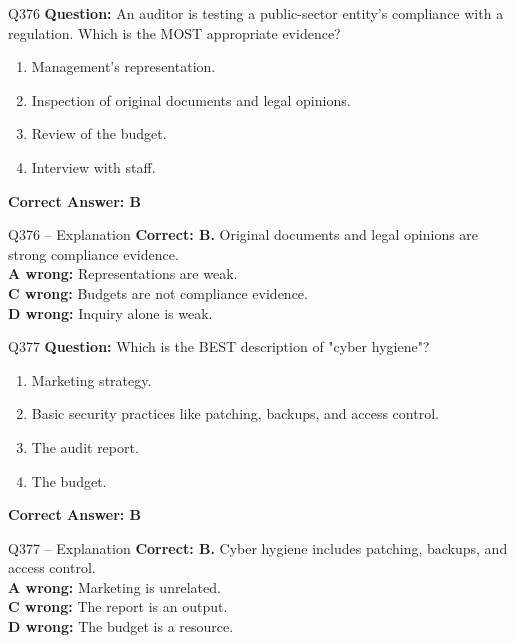 \documentclass[aspectratio=169,10pt]{beamer}
\begin{document}
	\begin{frame}[t]{Q376}
		\small
		\textbf{Question:} An auditor is testing a public-sector entity's compliance with a regulation. Which is the MOST appropriate evidence?
		\begin{enumerate}[label=\Alph*.,itemsep=1pt,topsep=2pt]
			\item Management's representation.
			\item Inspection of original documents and legal opinions.
			\item Review of the budget.
			\item Interview with staff.
		\end{enumerate}
		\vspace{4pt}
		\textbf{Correct Answer: B}
	\end{frame}
	
	\begin{frame}[t]{Q376 -- Explanation}
		\small
		\textbf{Correct: B.} Original documents and legal opinions are strong compliance evidence. \\[4pt]
		\textbf{A wrong:} Representations are weak. \\[2pt]
		\textbf{C wrong:} Budgets are not compliance evidence. \\[2pt]
		\textbf{D wrong:} Inquiry alone is weak.
	\end{frame}
	
	\begin{frame}[t]{Q377}
		\small
		\textbf{Question:} Which is the BEST description of "cyber hygiene"?
		\begin{enumerate}[label=\Alph*.,itemsep=1pt,topsep=2pt]
			\item Marketing strategy.
			\item Basic security practices like patching, backups, and access control.
			\item The audit report.
			\item The budget.
		\end{enumerate}
		\vspace{4pt}
		\textbf{Correct Answer: B}
	\end{frame}
	
	\begin{frame}[t]{Q377 -- Explanation}
		\small
		\textbf{Correct: B.} Cyber hygiene includes patching, backups, and access control. \\[4pt]
		\textbf{A wrong:} Marketing is unrelated. \\[2pt]
		\textbf{C wrong:} The report is an output. \\[2pt]
		\textbf{D wrong:} The budget is a resource.
	\end{frame}
	
\end{document}
